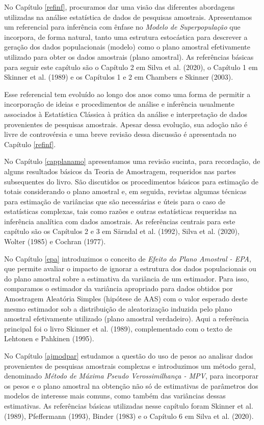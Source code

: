 \documentclass[
  12pt,
  brazilian,
]{book}
\theoremstyle{definition}
\theoremstyle{definition}
\theoremstyle{definition}
\theoremstyle{definition}
\theoremstyle{remark}
\begin{document}
No Capítulo \ref{refinf}, procuramos dar uma visão das diferentes abordagens utilizadas na análise estatística de dados de pesquisas amostrais. Apresentamos um referencial para inferência com ênfase no \emph{Modelo de Superpopulação} que incorpora, de forma natural, tanto uma estrutura estocástica para descrever a geração dos dados populacionais (modelo) como o plano amostral efetivamente utilizado para obter os dados amostrais (plano amostral). As referências básicas para seguir este capítulo são o Capítulo 2 em Silva et al. (2020), o Capítulo 1 em Skinner et al. (1989) e os Capítulos 1 e 2 em Chambers e Skinner (2003).

Esse referencial tem evoluído ao longo dos anos como uma forma de permitir a incorporação de ideias e procedimentos de análise e inferência usualmente associados à Estatística Clássica à prática da análise e interpretação de dados provenientes de pesquisas amostrais. Apesar dessa evolução, sua adoção não é livre de controvérsia e uma breve revisão dessa discussão é apresentada no Capítulo \ref{refinf}.

No Capítulo \ref{capplanamo} apresentamos uma revisão sucinta, para recordação, de alguns resultados básicos da Teoria de Amostragem, requeridos nas partes subsequentes do livro. São discutidos os procedimentos básicos para estimação de totais considerando o plano amostral e, em seguida, revistas algumas técnicas para estimação de variâncias que são necessárias e úteis para o caso de estatísticas complexas, tais como razões e outras estatísticas requeridas na inferência analítica com dados amostrais. As referências centrais para este capítulo são os Capítulos 2 e 3 em Särndal et al. (1992), Silva et al. (2020), Wolter (1985) e Cochran (1977).

No Capítulo \ref{epa} introduzimos o conceito de \emph{Efeito do Plano Amostral - EPA}, que permite avaliar o impacto de ignorar a estrutura dos dados populacionais ou do plano amostral sobre a estimativa da variância de um estimador. Para isso, comparamos o estimador da variância apropriado para dados obtidos por Amostragem Aleatória Simples (hipótese de AAS) com o valor esperado deste mesmo estimador sob a distribuição de aleatorização induzida pelo plano amostral efetivamente utilizado (plano amostral verdadeiro). Aqui a referência principal foi o livro Skinner et al. (1989), complementado com o texto de Lehtonen e Pahkinen (1995).

No Capítulo \ref{ajmodpar} estudamos a questão do uso de pesos ao analisar dados provenientes de pesquisas amostrais complexas e introduzimos um método geral, denominado \emph{Método de Máxima Pseudo Verossimilhança - MPV}, para incorporar os pesos e o plano amostral na obtenção não só de estimativas de parâmetros dos modelos de interesse mais comuns, como também das variâncias dessas estimativas. As referências básicas utilizadas nesse capítulo foram Skinner et al. (1989), Pfeffermann (1993), Binder (1983) e o Capítulo 6 em Silva et al. (2020).
\end{document}
